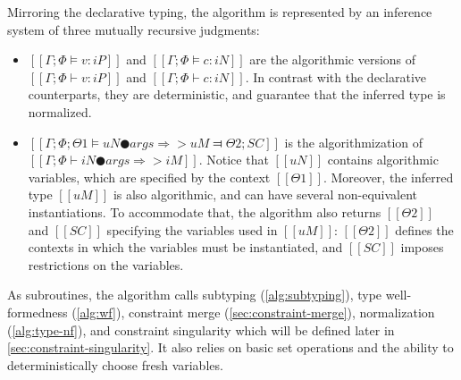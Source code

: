 \documentclass[a4,natbib=false]{article}
\begin{document}
Mirroring the declarative typing, 
the algorithm is represented by an inference system of three mutually recursive
judgments:
\begin{itemize}
  \item $[[Γ ; Φ ⊨ v : iP]]$ and  $[[Γ ; Φ ⊨ c : iN]]$
    are the algorithmic versions of $[[Γ ; Φ ⊢ v : iP]]$ and $[[Γ ; Φ ⊢ c : iN]]$.
    In contrast with the declarative counterparts, they are deterministic,
    and  guarantee that the inferred type is normalized. 
  \item $[[Γ ; Φ ; Θ1 ⊨ uN ● args ⇒> uM ⫤ Θ2 ; SC]]$
    is the algorithmization of $[[Γ ; Φ ⊢ iN ● args ⇒> iM]]$.
    Notice that $[[uN]]$ contains algorithmic variables, 
    which are specified by the context $[[Θ1]]$.
    Moreover, the inferred type $[[uM]]$ is also algorithmic,
    and can have several non-equivalent instantiations. To accommodate that, 
    the algorithm also returns $[[Θ2]]$ and $[[SC]]$ specifying 
    the variables used in $[[uM]]$: $[[Θ2]]$ defines the contexts
    in which the variables must be instantiated, and $[[SC]]$
    imposes restrictions on the variables. 
\end{itemize}
As subroutines, the algorithm calls
subtyping (\cref{alg:subtyping}),
type well-formedness (\cref{alg:wf}),
constraint merge (\cref{sec:constraint-merge}),
normalization (\cref{alg:type-nf}),
and constraint singularity which will be defined later in 
\cref{sec:constraint-singularity}.
It also relies on basic set operations and the ability to 
deterministically choose fresh variables.

\begin{algorithm}
  \hfill
  \begin{multicols}{2}
  \ottdefnATNInf{}

  \columnbreak
  \ottdefnATPInf{}
  \ottdefnATSpinInf{}
  \end{multicols}
\end{algorithm}
\end{document}

